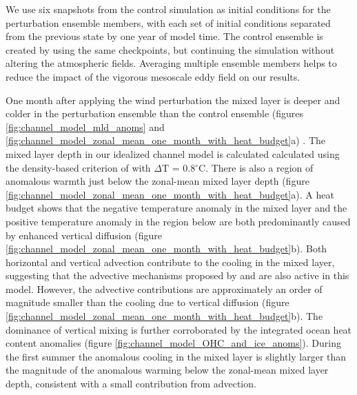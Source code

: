 \documentclass{ametsocV5}
\begin{document}
We use six snapshots from the control simulation as initial conditions for the perturbation ensemble members, with each set of initial conditions separated from the previous state by one year of model time. The control ensemble is created by using the same checkpoints, but continuing the simulation without altering the atmospheric fields. Averaging multiple ensemble members helps to reduce the impact of the vigorous mesoscale eddy field on our results.


One month after applying the wind perturbation the mixed layer is deeper and colder in the perturbation ensemble than the control ensemble (figures \ref{fig:channel_model_mld_anoms} and \ref{fig:channel_model_zonal_mean_one_month_with_heat_budget}a) \citep[c.f.][]{Sallee2010}. The mixed layer depth in our idealized channel model is calculated calculated using the density-based criterion of \citet{Kara2000} with $\Delta$T = 0.8$^{\circ}$C. There is also a region of anomalous warmth just below the zonal-mean mixed layer depth (figure \ref{fig:channel_model_zonal_mean_one_month_with_heat_budget}a). A heat budget shows that the negative temperature anomaly in the mixed layer and the positive temperature anomaly in the region below are both predominantly caused by enhanced vertical diffusion (figure \ref{fig:channel_model_zonal_mean_one_month_with_heat_budget}b). Both horizontal and vertical advection contribute to the cooling in the mixed layer, suggesting that the advective mechanisms proposed by \citet{Ferreira2015} and \citet{Purich2016} are also active in this model. However, the advective contributions are approximately an order of magnitude smaller than the cooling due to vertical diffusion (figure \ref{fig:channel_model_zonal_mean_one_month_with_heat_budget}b). The dominance of vertical mixing is further corroborated by the integrated ocean heat content anomalies (figure \ref{fig:channel_model_OHC_and_ice_anoms}). During the first summer the anomalous cooling in the mixed layer is slightly larger than the magnitude of the anomalous warming below the zonal-mean mixed layer depth, consistent with a small contribution from advection.
\end{document}
